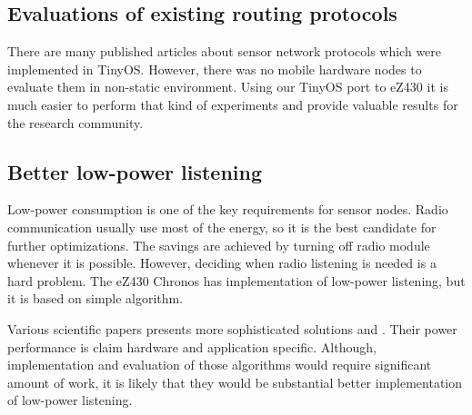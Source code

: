 \subsection{Evaluations of existing routing protocols}
There are many published articles about sensor network protocols which were implemented in TinyOS.
However, there was no mobile hardware nodes to evaluate them in non-static environment.
Using our TinyOS port to eZ430 it is much easier to perform that kind of experiments and provide valuable results for the research community.

\subsection{Better low-power listening}
Low-power consumption is one of the key requirements for sensor nodes.
Radio communication usually use most of the energy, so it is the best candidate for further optimizations.
The savings are achieved by turning off radio module whenever it is possible.
However, deciding when radio listening is needed is a hard problem.
The eZ430 Chronos has implementation of low-power listening, but it is based on simple algorithm.

Various scientific papers presents more sophisticated solutions \cite{BMAC} and \cite{DCCLPL}.
Their power performance is claim hardware and application specific.
Although, implementation and evaluation of those algorithms would require significant amount of work, it is likely that they would be substantial better implementation of low-power listening.


